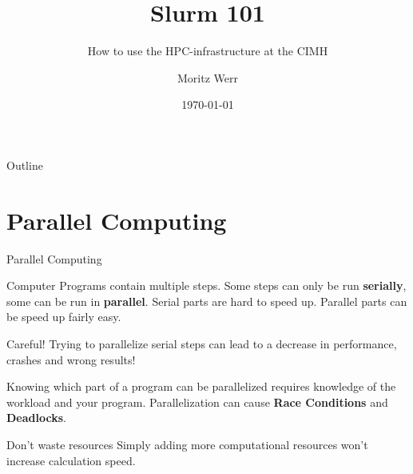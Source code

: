 \documentclass{beamer}
\title{Slurm 101}
\subtitle{How to use the HPC-infrastructure at the CIMH}
\author{Moritz Werr}
\institute{Research IT}
\date{\today}
\begin{document}
\begin{frame}
    \titlepage
\end{frame}

\begin{frame}{Outline}
    \tableofcontents
\end{frame}

\section{Parallel Computing}
\begin{frame}{Parallel Computing}

Computer Programs contain multiple steps.
Some steps can only be run \textbf{serially}, some can be run in \textbf{parallel}.
Serial parts are hard to speed up. Parallel parts can be speed up fairly easy.

\begin{alertblock}{Careful!}
	Trying to parallelize serial steps can lead to a decrease in performance, crashes and wrong results!
\end{alertblock}

Knowing which part of a program can be parallelized requires knowledge of the workload and your program.
 Parallelization can cause \textbf{Race Conditions} and \textbf{Deadlocks}.

\begin{block}{Don't waste resources}
Simply adding more computational resources won't increase calculation speed.
\end{block}



\end{frame}
\end{document}
